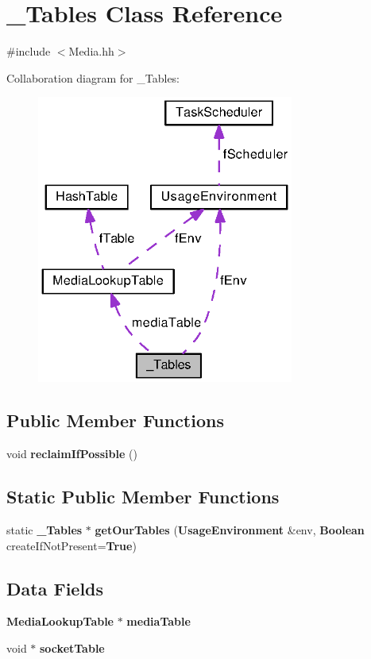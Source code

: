 \section{\+\_\+\+Tables Class Reference}
\label{class__Tables}


{\ttfamily \#include $<$Media.\+hh$>$}



Collaboration diagram for \+\_\+\+Tables\+:
\nopagebreak
\begin{figure}[H]
\begin{center}
\leavevmode
\includegraphics[width=239pt]{class__Tables__coll__graph}
\end{center}
\end{figure}
\subsection*{Public Member Functions}
\begin{DoxyCompactItemize}
\item 
void {\bf reclaim\+If\+Possible} ()
\end{DoxyCompactItemize}
\subsection*{Static Public Member Functions}
\begin{DoxyCompactItemize}
\item 
static {\bf \+\_\+\+Tables} $\ast$ {\bf get\+Our\+Tables} ({\bf Usage\+Environment} \&env, {\bf Boolean} create\+If\+Not\+Present={\bf True})
\end{DoxyCompactItemize}
\subsection*{Data Fields}
\begin{DoxyCompactItemize}
\item 
{\bf Media\+Lookup\+Table} $\ast$ {\bf media\+Table}
\item 
void $\ast$ {\bf socket\+Table}
\end{DoxyCompactItemize}
